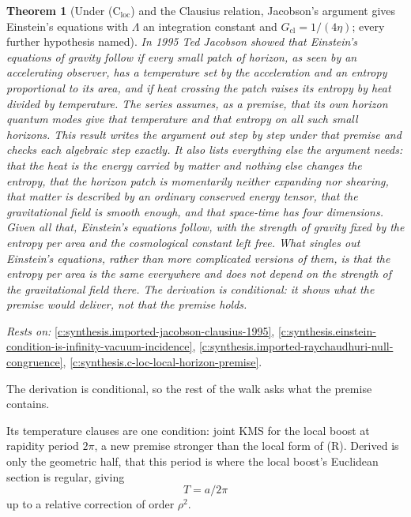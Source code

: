 \documentclass[11pt]{article}
\newtheorem{theorem}{Theorem}[section]
\theoremstyle{definition}
\theoremstyle{plain}
\begin{document}
\begin{theorem}[Under (C$_{\mathrm{loc}}$) and the Clausius relation, Jacobson's argument gives Einstein's equations with $\Lambda$ an integration constant and $G_{\mathrm{cl}} = 1/(4\eta)$; every further hypothesis named]\label{c:synthesis.einstein-equations-from-c-loc-and-clausius}
In 1995 Ted Jacobson showed that Einstein's equations of gravity follow if every small patch of horizon, as seen by an accelerating observer, has a temperature set by the acceleration and an entropy proportional to its area, and if heat crossing the patch raises its entropy by heat divided by temperature. The series assumes, as a premise, that its own horizon quantum modes give that temperature and that entropy on all such small horizons. This result writes the argument out step by step under that premise and checks each algebraic step exactly. It also lists everything else the argument needs: that the heat is the energy carried by matter and nothing else changes the entropy, that the horizon patch is momentarily neither expanding nor shearing, that matter is described by an ordinary conserved energy tensor, that the gravitational field is smooth enough, and that space-time has four dimensions. Given all that, Einstein's equations follow, with the strength of gravity fixed by the entropy per area and the cosmological constant left free. What singles out Einstein's equations, rather than more complicated versions of them, is that the entropy per area is the same everywhere and does not depend on the strength of the gravitational field there. The derivation is conditional: it shows what the premise would deliver, not that the premise holds.
\end{theorem}
\noindent\emph{Rests on:} \ref{c:synthesis.imported-jacobson-clausius-1995}, \ref{c:synthesis.einstein-condition-is-infinity-vacuum-incidence}, \ref{c:synthesis.imported-raychaudhuri-null-congruence}, \ref{c:synthesis.c-loc-local-horizon-premise}.

The derivation is conditional, so the rest of the walk asks what the premise contains.

Its temperature clauses are one condition: joint KMS for the local boost at rapidity period $2\pi$, a new premise stronger than the local form of (R). Derived is only the geometric half, that this period is where the local boost's Euclidean section is regular, giving \[ T = a/2\pi \] up to a relative correction of order $\rho^{2}$.
\end{document}
